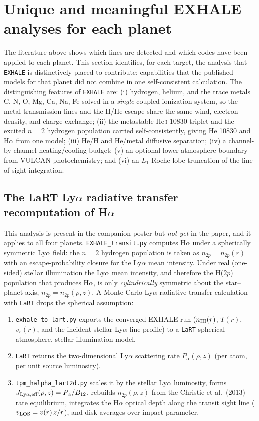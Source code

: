 \section{Unique and meaningful EXHALE analyses for each planet}
\label{sec:unique}

The literature above shows which lines are detected and which codes have been
applied to each planet. This section identifies, for each target, the analysis
that \texttt{EXHALE} is distinctively placed to contribute: capabilities that
the published models for that planet did not combine in one self-consistent
calculation. The distinguishing features of \texttt{EXHALE} are: (i) hydrogen,
helium, and the trace metals C, N, O, Mg, Ca, Na, Fe solved in a \emph{single}
coupled ionization system, so the metal transmission lines and the H/He escape
share the same wind, electron density, and charge exchange; (ii) the metastable
He\,\textsc{i} 10830 triplet and the excited $n=2$ hydrogen population carried
self-consistently, giving He 10830 and H$\alpha$ from one model; (iii) He/H and
He/metal diffusive separation; (iv) a channel-by-channel heating/cooling budget;
(v) an optional lower-atmosphere boundary from VULCAN photochemistry; and (vi) an
$L_1$ Roche-lobe truncation of the line-of-sight integration.

\subsection{The LaRT Ly$\alpha$ radiative transfer recomputation of H$\alpha$}
\label{sec:lart}

This analysis is present in the companion poster but \emph{not yet} in the paper,
and it applies to all four planets. \texttt{EXHALE\_transit.py} computes H$\alpha$
under a spherically symmetric Ly$\alpha$ field: the $n=2$ hydrogen population is
taken as $n_{2p}=n_{2p}(r)$ with an escape-probability closure for the Ly$\alpha$
mean intensity. Under real (one-sided) stellar illumination the Ly$\alpha$ mean
intensity, and therefore the H($2p$) population that produces H$\alpha$, is
only \emph{cylindrically} symmetric about the star--planet axis,
$n_{2p}=n_{2p}(\rho,z)$. A Monte-Carlo Ly$\alpha$ radiative-transfer calculation
with \texttt{LaRT} drops the spherical assumption:

\begin{enumerate}
\item \texttt{exhale\_to\_lart.py} exports the converged EXHALE run
  ($n_{\rm HI}(r)$, $T(r)$, $v_r(r)$, and the incident stellar Ly$\alpha$ line
  profile) to a \texttt{LaRT} spherical-atmosphere, stellar-illumination model.
\item \texttt{LaRT} returns the two-dimensional Ly$\alpha$ scattering rate
  $P_\alpha(\rho,z)$ (per atom, per unit source luminosity).
\item \texttt{tpm\_halpha\_lart2d.py} scales it by the stellar Ly$\alpha$
  luminosity, forms $J_{{\rm Ly}\alpha,\rm eff}(\rho,z)=P_\alpha/B_{12}$, rebuilds
  $n_{2p}(\rho,z)$ from the Christie et al.\ (2013) rate equilibrium, integrates
  the H$\alpha$ optical depth along the transit sight line
  ($v_{\rm LOS}=v(r)\,z/r$), and disk-averages over impact parameter.
\end{enumerate}

